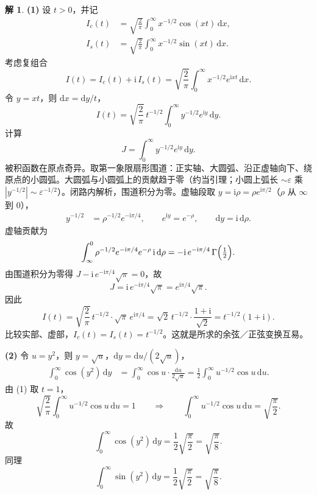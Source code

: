 \documentclass[11pt]{article}
\theoremstyle{remark}
\theoremstyle{definition}
\newtheorem{solution}{解}
\begin{document}
\begin{solution}
\noindent\textbf{(1)}
设 $t>0$，并记
\begin{align*}
I_c(t)
&=\sqrt{\frac{2}{\pi}}
  \int_0^{\infty}x^{-1/2}\cos(xt)\,\mathrm{d}x,\\
I_s(t)
&=\sqrt{\frac{2}{\pi}}
  \int_0^{\infty}x^{-1/2}\sin(xt)\,\mathrm{d}x.
\end{align*}
考虑复组合
\[
I(t)=I_c(t)+\mathrm{i}\,I_s(t)
=\sqrt{\frac{2}{\pi}}
  \int_0^{\infty}x^{-1/2}e^{\mathrm{i}xt}\,\mathrm{d}x.
\]
令 $y=xt$，则 $\mathrm{d}x=\mathrm{d}y/t$，
\[
I(t)
=\sqrt{\frac{2}{\pi}}\,t^{-1/2}
  \int_0^{\infty}y^{-1/2}e^{\mathrm{i}y}\,\mathrm{d}y.
\]
计算
\[
J=\int_0^{\infty}y^{-1/2}e^{\mathrm{i}y}\,\mathrm{d}y.
\]
被积函数在原点奇异。取第一象限扇形围道：正实轴、大圆弧、沿正虚轴向下、绕原点的小圆弧。大圆弧与小圆弧上的贡献趋于零（约当引理；小圆上弧长 $\sim\varepsilon$ 乘 $|y^{-1/2}|\sim\varepsilon^{-1/2}$）。闭路内解析，围道积分为零。虚轴段取 $y=\mathrm{i}\rho=\rho e^{\mathrm{i}\pi/2}$（$\rho$ 从 $\infty$ 到 $0$），
\begin{align*}
y^{-1/2}
&=\rho^{-1/2}e^{-\mathrm{i}\pi/4},
\qquad
e^{\mathrm{i}y}=e^{-\rho},
\qquad
\mathrm{d}y=\mathrm{i}\,\mathrm{d}\rho.
\end{align*}
虚轴贡献为
\[
\int_{\infty}^{0}
\rho^{-1/2}e^{-\mathrm{i}\pi/4}e^{-\rho}\,\mathrm{i}\,\mathrm{d}\rho
=-\mathrm{i}\,e^{-\mathrm{i}\pi/4}\,\Gamma\Bigl(\tfrac12\Bigr).
\]
由围道积分为零得 $J-\mathrm{i}\,e^{-\mathrm{i}\pi/4}\sqrt{\pi}=0$，故
\[
J=\mathrm{i}\,e^{-\mathrm{i}\pi/4}\sqrt{\pi}
=e^{\mathrm{i}\pi/4}\sqrt{\pi}.
\]
因此
\[
I(t)
=\sqrt{\frac{2}{\pi}}\,t^{-1/2}\cdot\sqrt{\pi}\,e^{\mathrm{i}\pi/4}
=\sqrt{2}\,t^{-1/2}\cdot\frac{1+\mathrm{i}}{\sqrt{2}}
=t^{-1/2}(1+\mathrm{i}).
\]
比较实部、虚部，$I_c(t)=I_s(t)=t^{-1/2}$。这就是所求的余弦／正弦变换互易。

\medskip
\noindent\textbf{(2)}
令 $u=y^2$，则 $y=\sqrt{u}$，$\mathrm{d}y=\mathrm{d}u/(2\sqrt{u})$，
\begin{align*}
\int_0^{\infty}\cos(y^2)\,\mathrm{d}y
&=\int_0^{\infty}\cos u\cdot\frac{\mathrm{d}u}{2\sqrt{u}}
=\frac12\int_0^{\infty}u^{-1/2}\cos u\,\mathrm{d}u.
\end{align*}
由 (1) 取 $t=1$，
\[
\sqrt{\frac{2}{\pi}}
\int_0^{\infty}u^{-1/2}\cos u\,\mathrm{d}u=1
\qquad\Longrightarrow\qquad
\int_0^{\infty}u^{-1/2}\cos u\,\mathrm{d}u
=\sqrt{\frac{\pi}{2}}.
\]
故
\[
\int_0^{\infty}\cos(y^2)\,\mathrm{d}y
=\frac12\sqrt{\frac{\pi}{2}}
=\sqrt{\frac{\pi}{8}}.
\]
同理
\[
\int_0^{\infty}\sin(y^2)\,\mathrm{d}y
=\frac12\sqrt{\frac{\pi}{2}}
=\sqrt{\frac{\pi}{8}}.
\]
\end{solution}
\end{document}
